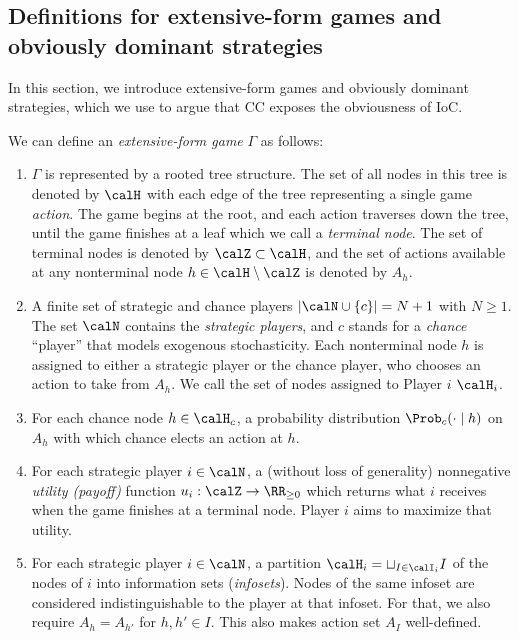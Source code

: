 \subsection{Definitions for extensive-form games and obviously dominant strategies}\label{appsec:efg-ods}
In this section, we introduce extensive-form games and obviously dominant strategies, which we use to argue that CC exposes the obviousness of IoC.

\begin{definition}
    We can define an \emph{extensive-form game} $\Gamma$ as follows:
    \begin{enumerate}
        \item  $\Gamma$ is represented by a rooted tree structure. The set of all nodes in this tree is denoted by $\calH$ with each edge of the tree representing a single game \emph{action}. The game begins at the root, and each action traverses down the tree, until the game finishes at a leaf which we call a \emph{terminal node}. The set of terminal nodes is denoted by $\calZ \subset \calH$, and the set of actions available at any nonterminal node $h \in \calH \setminus \calZ$ is denoted by $A_h$.
        \item A finite set of strategic and chance players $|\calN \cup \{c\}| = N+1$ with $N \geq 1$. The set $\calN$ contains the \emph{strategic players}, and $c$ stands for a \emph{chance} ``player'' that models exogenous stochasticity. Each nonterminal node $h$ is assigned to either a strategic player or the chance player, who chooses an action to take from $A_h$. We call the set of nodes assigned to Player $i$ $\calH_i$.
        \item For each chance node $h \in \calH_c$, a probability distribution $\Prob_c(\cdot \mid h)$ on $A_h$ with which chance elects an action at $h$.
        \item For each strategic player $i \in \calN$, a (without loss of generality) nonnegative \emph{utility (payoff)} function $u_i : \calZ \to \RR_{\geq 0}$ which returns what $i$ receives when the game finishes at a terminal node. Player $i$ aims to maximize that utility.
        \item For each strategic player $i \in \calN$, a partition $\calH_i = \sqcup_{I \in \calI_i} I$ of the nodes of $i$ into information sets (\emph{infosets}). Nodes of the same infoset are considered indistinguishable to the player at that infoset. For that, we also require $A_h = A_{h'}$ for $h, h' \in I$. This also makes action set $A_I$ well-defined.
    \end{enumerate}
\end{definition}

